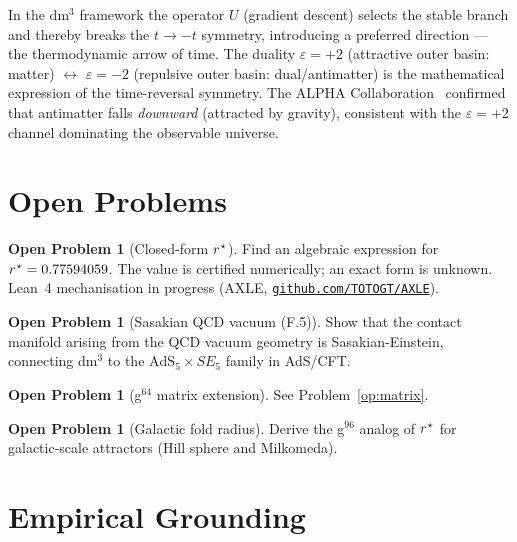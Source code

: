 \documentclass[12pt,a4paper]{article}
\theoremstyle{plain}
\theoremstyle{definition}
\newtheorem{openproblem}[theorem]{Open Problem}
\theoremstyle{remark}
\newcommand{\eps}{\varepsilon}
\newcommand{\rstar}{r^{\kern0.5pt\star}}
\begin{document}
In the dm$^3$ framework the operator $U$ (gradient descent) selects the stable branch
and thereby breaks the $t\to-t$ symmetry, introducing a preferred direction — the
thermodynamic arrow of time.
The duality $\eps=+2$ (attractive outer basin: matter) $\leftrightarrow$ $\eps=-2$
(repulsive outer basin: dual/antimatter) is the mathematical expression of the
time-reversal symmetry.
The ALPHA Collaboration~\cite{ALPHA2023} confirmed that antimatter falls
\emph{downward} (attracted by gravity), consistent with the $\eps=+2$ channel
dominating the observable universe.

\section{Open Problems}
\label{sec:open}

\begin{openproblem}[Closed-form $\rstar$]
Find an algebraic expression for $\rstar=0.77594059$.
The value is certified numerically; an exact form is unknown.
Lean~4 mechanisation in progress (AXLE,
\href{https://github.com/TOTOGT/AXLE}{\texttt{github.com/TOTOGT/AXLE}}).
\end{openproblem}

\begin{openproblem}[Sasakian QCD vacuum (F.5)]
Show that the contact manifold arising from the QCD vacuum geometry is
Sasakian-Einstein, connecting dm$^3$ to the
$\mathrm{AdS}_5\times SE_5$ family in AdS/CFT.
\end{openproblem}

\begin{openproblem}[g$^{64}$ matrix extension]
See Problem~\ref{op:matrix}.
\end{openproblem}

\begin{openproblem}[Galactic fold radius]
Derive the g$^{96}$ analog of $\rstar$ for galactic-scale attractors (Hill sphere
and Milkomeda).
\end{openproblem}

\section{Empirical Grounding}
\label{sec:empirical}
\end{document}
